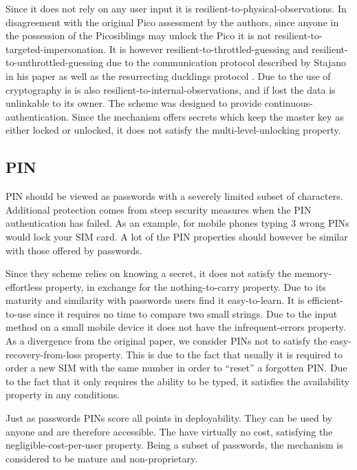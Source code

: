 	Since it does not rely on any user input it is resilient-to-physical-observations. In disagreement with the original Pico assessment by the authors, since anyone in the possession of the Picosiblings may unlock the Pico it is not resilient-to-targeted-impersonation. It is however resilient-to-throttled-guessing and resilient-to-unthrottled-guessing due to the communication protocol described by Stajano in his paper \cite{stajano2011pico} as well as the resurrecting ducklings protocol \cite{stajano2000resurrecting}. Due to the use of cryptography is is also resilient-to-internal-observations, and if lost the data is unlinkable to its owner. The scheme was designed to provide continuous-authentication. Since the mechanism offers secrets which keep the master key as either locked or unlocked, it does not satisfy the multi-level-unlocking property.

	\subsection{PIN}
	PIN should be viewed as passwords with a severely limited subset of characters. Additional protection comes from steep security measures when the PIN authentication has failed. As an example, for mobile phones typing 3 wrong PINs would lock your SIM card. A lot of the PIN properties should however be similar with those offered by passwords.
	
	Since they scheme relies on knowing a secret, it does not satisfy the memory-effortless property, in exchange for the nothing-to-carry property. Due to its maturity and similarity with passwords users find it easy-to-learn. It is efficient-to-use since it requires no time to compare two small strings. Due to the input method on a small mobile device it does not have the infrequent-errors property. As a divergence from the original paper, we consider PINs not to satisfy the easy-recovery-from-loss property. This is due to the fact that usually it is required to order a new SIM with the same number in order to ``reset'' a forgotten PIN. Due to the fact that it only requires the ability to be typed, it satisfies the availability property in any conditions.
	
	Just as passwords PINs score all points in deployability. They can be used by anyone and are therefore accessible. The have virtually no cost, satisfying the negligible-cost-per-user property. Being a subset of passwords, the mechanism is considered to be mature and non-proprietary.
	
